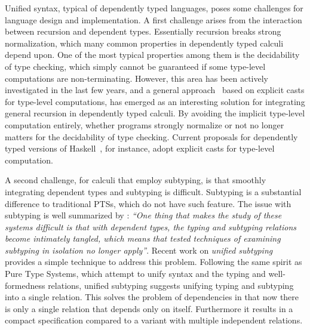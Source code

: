 Unified syntax, typical of dependently typed languages,
poses some challenges for language design and implementation.
A first challenge arises from the interaction between recursion and dependent types.
Essentially recursion breaks strong normalization, which
many common properties in dependently typed calculi depend upon. One of the most
typical properties among them is the decidability of type checking,
which simply cannot be guaranteed if some
type-level computations are non-terminating.
However, this area has been actively investigated in the
last few years, and a general approach~\citep{guru,sjoberg:msfp12, kimmel:plpv, zombie:popl15,
  isotype} based on explicit casts for type-level computations,
has emerged as an interesting solution for integrating general recursion
in dependently typed calculi. By avoiding the implicit type-level computation
entirely, whether programs strongly normalize or not no longer matters for the
decidability of type checking.
Current proposals for dependently typed versions of Haskell~\citep{dependenthaskell},
for instance, adopt explicit casts for type-level computation.

A second challenge, for calculi that employ subtyping, is that
smoothly integrating
dependent types and subtyping is difficult. Subtyping is a
substantial difference to traditional PTSs, which do not have such feature.
The issue with subtyping
is well summarized by \cite{subdep}:
\emph{``One thing that makes the study of these systems difficult is that
  with
dependent types, the typing and subtyping relations become intimately
tangled, which means that tested techniques of examining subtyping in
isolation no longer apply''}.
Recent work on \emph{unified subtyping}~\citep{full} provides a
simple technique to address this problem.
Following the same spirit as Pure Type Systems,
which attempt to unify syntax and the typing and well-formedness relations,
unified subtyping suggests unifying typing
and subtyping into a single relation. This solves the problem of dependencies
in that now there is only a single relation that depends only on itself. Furthermore
it results in a compact specification compared to a variant with multiple
independent relations.

